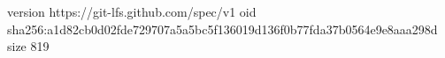 version https://git-lfs.github.com/spec/v1
oid sha256:a1d82cb0d02fde729707a5a5bc5f136019d136f0b77fda37b0564e9e8aaa298d
size 819
